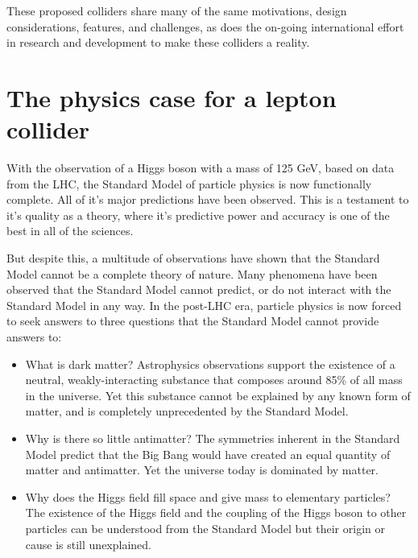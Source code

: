 These proposed colliders share many of the same motivations, design considerations, features, and challenges, as does the on-going international effort in research and development to make these colliders a reality.

\section{The physics case for a lepton collider}
With the observation of a Higgs boson with a mass of 125 GeV, based on data from the \acrlong{LHC}, the Standard Model of particle physics is now functionally complete. All of it's major predictions have been observed. This is a testament to it's quality as a theory, where it's predictive power and accuracy is one of the best in all of the sciences.

But despite this, a multitude of observations have shown that the Standard Model cannot be a complete theory of nature. Many phenomena have been observed that the Standard Model cannot predict, or do not interact with the Standard Model in any way. In the post-LHC era, particle physics is now forced to seek answers to three questions that the Standard Model cannot provide answers to:

\begin{itemize}
	\item What is dark matter? Astrophysics observations support the existence of a neutral, weakly-interacting substance that composes around 85\% of all mass in the universe. Yet this substance cannot be explained by any known form of matter, and is completely unprecedented by the Standard Model.
	\item Why is there so little antimatter? The symmetries inherent in the Standard Model predict that the Big Bang would have created an equal quantity of matter and antimatter. Yet the universe today is dominated by matter.
	\item Why does the Higgs field fill space and give mass to elementary particles? The existence of the Higgs field and the coupling of the Higgs boson to other particles can be understood from the Standard Model but their origin or cause is still unexplained.
\end{itemize}

